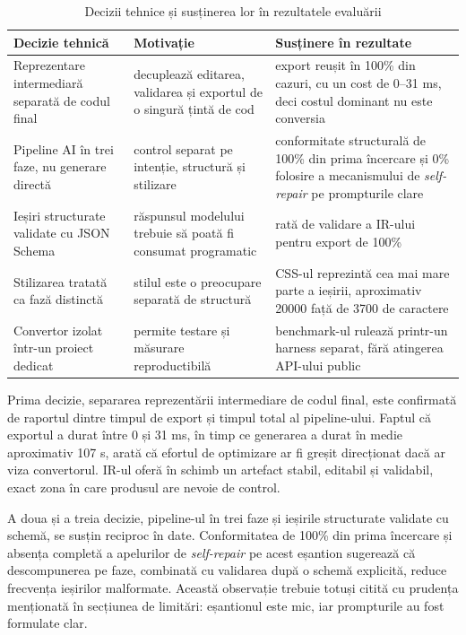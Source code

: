 \begin{table}[H]
  \centering
  \caption{Decizii tehnice și susținerea lor în rezultatele evaluării}
  \label{tab:decizii-rezultate}
  \renewcommand{\arraystretch}{1.2}
  \begin{tabularx}{\textwidth}{>{\RaggedRight\arraybackslash}p{4.1cm}YY}
    \toprule
    \textbf{Decizie tehnică} & \textbf{Motivație} & \textbf{Susținere în rezultate} \\
    \midrule
    Reprezentare intermediară separată de codul final & decuplează editarea, validarea și exportul de o singură țintă de cod & export reușit în 100\% din cazuri, cu un cost de 0--31 ms, deci costul dominant nu este conversia \\
    Pipeline AI în trei faze, nu generare directă & control separat pe intenție, structură și stilizare & conformitate structurală de 100\% din prima încercare și 0\% folosire a mecanismului de \textit{self-repair} pe prompturile clare \\
    Ieșiri structurate validate cu JSON Schema & răspunsul modelului trebuie să poată fi consumat programatic & rată de validare a IR-ului pentru export de 100\% \\
    Stilizarea tratată ca fază distinctă & stilul este o preocupare separată de structură & CSS-ul reprezintă cea mai mare parte a ieșirii, aproximativ 20000 față de 3700 de caractere \\
    Convertor izolat într-un proiect dedicat & permite testare și măsurare reproductibilă & benchmark-ul rulează printr-un harness separat, fără atingerea API-ului public \\
    \bottomrule
  \end{tabularx}
\end{table}

Prima decizie, separarea reprezentării intermediare de codul final, este confirmată de raportul dintre timpul de export și timpul total al pipeline-ului. Faptul că exportul a durat între 0 și 31 ms, în timp ce generarea a durat în medie aproximativ 107 s, arată că efortul de optimizare ar fi greșit direcționat dacă ar viza convertorul. IR-ul oferă în schimb un artefact stabil, editabil și validabil, exact zona în care produsul are nevoie de control.

A doua și a treia decizie, pipeline-ul în trei faze și ieșirile structurate validate cu schemă, se susțin reciproc în date. Conformitatea de 100\% din prima încercare și absența completă a apelurilor de \textit{self-repair} pe acest eșantion sugerează că descompunerea pe faze, combinată cu validarea după o schemă explicită, reduce frecvența ieșirilor malformate. Această observație trebuie totuși citită cu prudența menționată în secțiunea de limitări: eșantionul este mic, iar prompturile au fost formulate clar.


